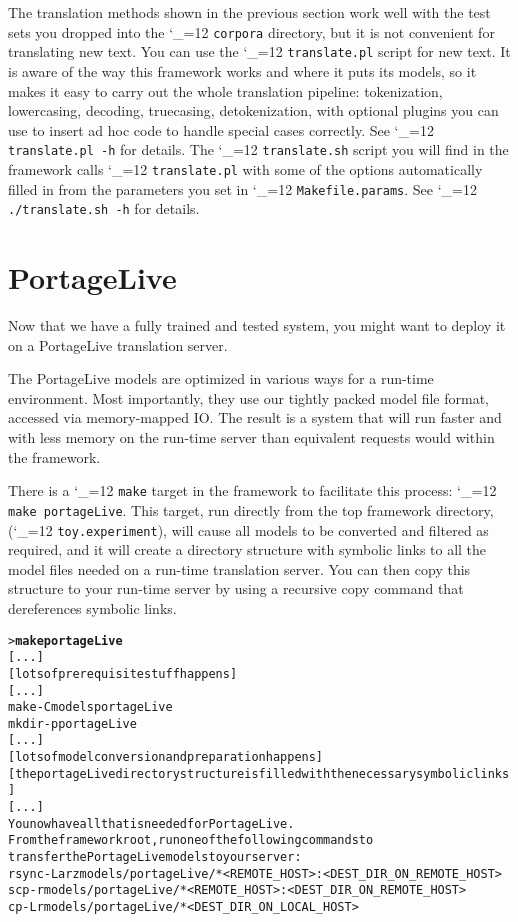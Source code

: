 \documentclass[11pt,letterpaper]{article}
\def\code{\begingroup\catcode`\_=12 \codex}
\newcommand{\codex}[1]{\texttt{#1}\endgroup}
\begin{document}
The translation methods shown in the previous section work well with the test
sets you dropped into the \code{corpora} directory, but it is not convenient for
translating new text.  You can use the \code{translate.pl} script for new text.
It is aware of the way this framework works and where it puts its models, so it
makes it easy to carry out the whole translation pipeline: tokenization,
lowercasing, decoding, truecasing, detokenization, with optional plugins you
can use to insert ad hoc code to handle special cases correctly.  See
\code{translate.pl -h} for details.  The \code{translate.sh} script you will
find in the framework calls \code{translate.pl} with some of the options
automatically filled in from the parameters you set in \code{Makefile.params}.
See \code{./translate.sh -h} for details.

\section{PortageLive} \label{PLive}

Now that we have a fully trained and tested system, you might want to deploy it
on a PortageLive translation server.

The PortageLive models are optimized in various ways for a run-time
environment.  Most importantly, they use our tightly packed model file format,
accessed via memory-mapped IO.
The result is a system that will run faster and with less memory on the
run-time server than equivalent requests would within the framework.

There is a \code{make} target in the framework to facilitate this process:
\code{make portageLive}.  This target, run directly from the top framework
directory, (\code{toy.experiment}), will cause all models to be converted and
filtered as required, and it will create a directory structure with symbolic
links to all the model files needed on a run-time translation server.  You can
then copy this structure to your run-time server by using a recursive copy
command that dereferences symbolic links.

\begin{small}
\begin{alltt}
   > \textbf{make portageLive}
   [...]
   [lots of prerequisite stuff happens]
   [...]
   make -C models portageLive
   mkdir -p portageLive
   [...]
   [lots of model conversion and preparation happens]
   [the portageLive directory structure is filled with the necessary symbolic links]
   [...]
   You now have all that is needed for PortageLive.
   From the framework root, run one of the following commands to
   transfer the PortageLive models to your server:
   rsync -Larz models/portageLive/* <REMOTE_HOST>:<DEST_DIR_ON_REMOTE_HOST>
   scp -r models/portageLive/* <REMOTE_HOST>:<DEST_DIR_ON_REMOTE_HOST>
   cp -Lr models/portageLive/* <DEST_DIR_ON_LOCAL_HOST>
\end{alltt}
\end{small}
\end{document}

